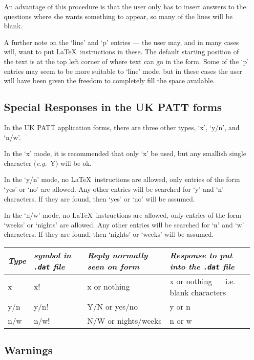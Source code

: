 An advantage of this procedure is that the user only has to insert answers
to the questions where she wants something to appear, so many of the lines
will be blank. 

A further note on the `line' and `p' entries --- the user may, and in many
cases will, want to put \LaTeX\ instructions in these. The default starting
position of the text is at the top left corner of where text can go in the
form. Some of the `p' entries may seem to be more suitable to `line' mode,
but in these cases the  user will have been given the freedom to completely
fill the space available. 

\subsection {Special Responses in the UK PATT forms}

In the UK PATT application forms, there are three other types, `x', `y/n',
and `n/w'. 

In the `x' mode, it is recommended that only `x' be used, but any smallish
single character ({\it e.g.}~{\small Y}) will be ok. 

In the `y/n' mode, no \LaTeX\ instructions are allowed, only entries of the
form `yes' or `no' are allowed. Any other entries will be searched for `y'
and `n' characters. If they are found, then `yes' or `no' will be assumed. 

In the `n/w' mode, no \LaTeX\ instructions are allowed, only entries of the
form `weeks' or `nights' are allowed. Any other entries will be searched
for `n' and `w' characters. If they are found, then `nights' or `weeks' will
be assumed. 


{\small
\begin{tabular}{|l|p{0.6in}|p{1.7in}|p{3.0in}|} \hline
{\it Type} & {\it symbol in {\tt .dat} file}   & {\it Reply normally seen on 
form} & {\it Response to put into the {\tt .dat} file} \\ \hline
x     &    x!  &   x or nothing    &  x or nothing --- i.e. blank characters \\ \hline
y/n   &  y/n!  &   Y/N or yes/no   &  y or n \\  \hline
n/w   &  n/w!  &   N/W or nights/weeks &  n  or w \\  \hline
\end{tabular}}


\subsection{Warnings}

